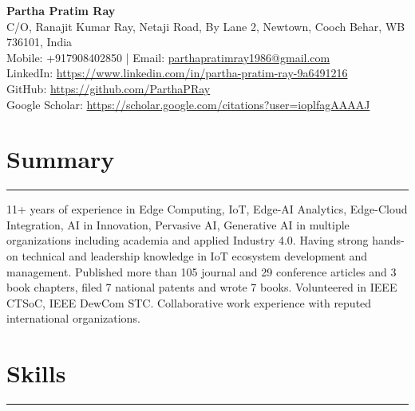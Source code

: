 \documentclass[10pt, a4paper]{article}
\begin{document}
	
	\begin{center}
		\textbf{\Large Partha Pratim Ray}\\
		\vspace{2mm}
		C/O, Ranajit Kumar Ray, Netaji Road, By Lane 2, Newtown, Cooch Behar, WB 736101, India \\
    Mobile: +917908402850 | Email: \href{mailto:parthapratimray1986@gmail.com}{parthapratimray1986@gmail.com}\\
		LinkedIn: \href{https://www.linkedin.com/in/partha-pratim-ray-9a6491216}{https://www.linkedin.com/in/partha-pratim-ray-9a6491216} \\
		GitHub: \href{https://github.com/ParthaPRay}{https://github.com/ParthaPRay} \\
		Google Scholar: \href{https://scholar.google.com/citations?user=ioplfagAAAAJ}{https://scholar.google.com/citations?user=ioplfagAAAAJ}\\
		\vspace{2mm}
	\end{center}
	
	\vspace*{-8mm}	
	
	\section*{Summary}
	\vspace*{-2.5mm}
	\hrule 
	\vspace*{2mm}
	11+ years of experience in Edge Computing, IoT, Edge-AI Analytics, Edge-Cloud Integration, AI in Innovation, Pervasive AI, Generative AI in multiple organizations including academia and applied Industry 4.0. Having strong hands-on technical and leadership knowledge in IoT ecosystem development and management. Published more than 105 journal and 29 conference articles and 3 book chapters, filed 7 national patents and wrote 7 books. Volunteered in IEEE CTSoC, IEEE DewCom STC. Collaborative work experience with reputed international organizations. 
	
	\vspace*{-3mm}	
		
		
		\section*{Skills}
		\vspace*{-2.5mm}
		\hrule 
		\vspace*{2mm}
\end{document}

